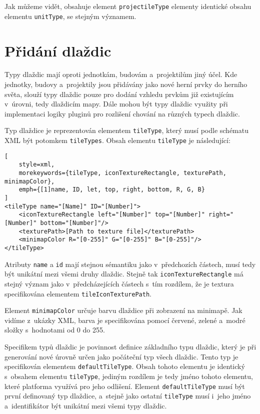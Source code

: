 Jak můžeme vidět, obsahuje element \texttt{projectileType} elementy identické obsahu elementu \texttt{unitType}, se stejným významem.


\section{Přidání dlaždic}
Typy dlaždic mají oproti jednotkám, budovám a~projektilům jiný účel. Kde jednotky, budovy a~projektily jsou přidávány jako nové herní prvky do herního světa, slouží typy dlaždic pouze pro dodání vzhledu prvkům již existujícím v~úrovni, tedy dlaždicím mapy. Dále mohou být typy dlaždic využity při implementaci logiky pluginů pro rozlišení chování na různých typech dlaždic.

Typ dlaždice je reprezentován elementem \texttt{tileType}, který musí podle schématu XML být potomkem \texttt{tileTypes}. Obsah elementu \texttt{tileType} je následující:

\begin{lstlisting}[
	style=xml,
	morekeywords={tileType, iconTextureRectangle, texturePath, minimapColor},
	emph={[1]name, ID, let, top, right, bottom, R, G, B}
]
<tileType name="[Name]" ID="[Number]">
	<iconTextureRectangle left="[Number]" top="[Number]" right="[Number]" bottom="[Number]"/>
	<texturePath>[Path to texture file]</texturePath>
	<minimapColor R="[0-255]" G="[0-255]" B="[0-255]"/>
</tileType>
\end{lstlisting}

Atributy \texttt{name} a \texttt{id} mají stejnou sémantiku jako v~předchozích částech, musí tedy být unikátní mezi všemi druhy dlaždic. Stejně tak \texttt{iconTextureRectangle} má stejný význam jako v~předcházejících částech s~tím rozdílem, že je textura specifikována elementem \texttt{tileIconTexturePath}.

Element \texttt{minimapColor} určuje barvu dlaždice při zobrazení na minimapě. Jak vidíme z~ukázky XML, barva je specifikována pomocí červené, zelené a~modré složky s~hodnotami od 0 do 255.

Specifikem typů dlaždic je povinnost definice základního typu dlaždic, který je při generování nové úrovně určen jako počáteční typ všech dlaždic. Tento typ je specifikován elementem \texttt{defaultTileType}. Obsah tohoto elementu je identický s~obsahem elementu \texttt{tileType}, jediným rozdílem je tedy jméno tohoto elementu, které platforma využívá pro jeho odlišení. Element \texttt{defaultTileType} musí být první definovaný typ dlaždice, a~stejně jako ostatní \texttt{tileType} musí i~jeho jméno a~identifikátor být unikátní mezi všemi typy dlaždic.

